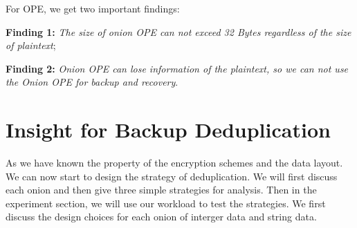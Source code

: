 


For OPE, we get two important findings:

\textbf{Finding 1:} \textit{The size of onion OPE can not exceed 32 Bytes regardless of the size of plaintext};

\textbf{Finding 2:} \textit{Onion OPE can lose information of the plaintext, so we can not use the Onion OPE for backup and recovery}.

\section{Insight for Backup Deduplication}
As we have known the property of the encryption schemes and the data layout. We can now start to design the strategy of deduplication. We will first discuss each onion and then give three simple strategies for analysis. Then in the experiment section, we will use our workload to test the strategies. We first discuss the design choices for each onion of interger data and string data. 


